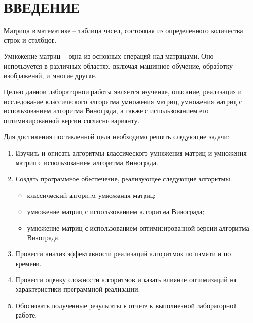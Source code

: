 \chapter*{ВВЕДЕНИЕ}

Матрица в математике -- таблица чисел, состоящая из определенного количества строк и столбцов.

Умножение матриц -- одна из основных операций над матрицами. Оно используется в различных областях, включая машинное обучение, обработку изображений, и многие другие.

Целью данной лабораторной работы является изучение, описание, реализация и исследование классического алгоритма умножения матриц, умножения матриц с использованием алгоритма Винограда, а также с использованием его оптимизированной версии согласно варианту.

Для достижения поставленной цели необходимо решить следующие задачи:

\begin{enumerate}[label={\arabic*)}]
	\item Изучить и описать алгоритмы классического умножения матриц и умножения матриц с использованием алгоритма Винограда.
	\item Создать программное обеспечение, реализующее следующие алгоритмы:
	\begin{itemize}[label=--]
		\item классический алгоритм умножения матриц;
		\item умножение матриц с использованием алгоритма Винограда;
		\item умножение матриц с использованием оптимизированной версии алгоритма Винограда.
	\end{itemize}

	\item Провести анализ эффективности реализаций алгоритмов по памяти и по времени.
	\item Провести оценку сложности алгоритмов и казать влияние оптимизаций на характеристики программной реализации.
	\item Обосновать полученные результаты в отчете к выполненной лабораторной работе.
\end{enumerate}
